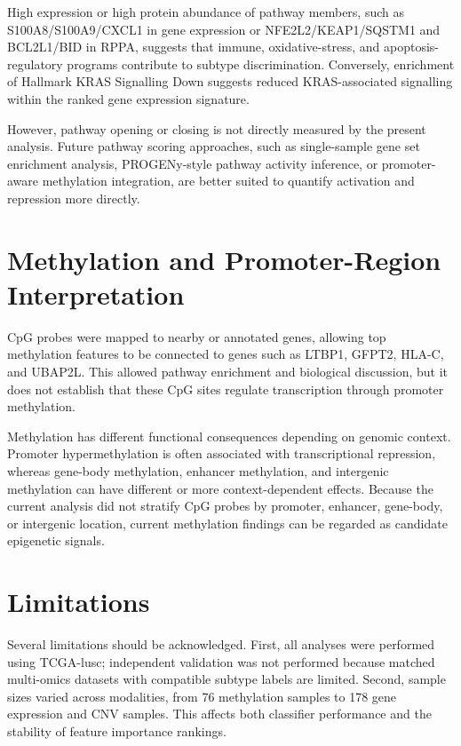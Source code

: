 High expression or high protein abundance of pathway members, such as S100A8/S100A9/CXCL1 in gene expression or NFE2L2/KEAP1/SQSTM1 and BCL2L1/BID in RPPA, suggests that immune, oxidative-stress, and apoptosis-regulatory programs contribute to subtype discrimination. Conversely, enrichment of Hallmark KRAS Signalling Down suggests reduced KRAS-associated signalling within the ranked gene expression signature.

However, pathway opening or closing is not directly measured by the present analysis. Future pathway scoring approaches, such as single-sample gene set enrichment analysis, PROGENy-style pathway activity inference, or promoter-aware methylation integration, are better suited to quantify activation and repression more directly.

\section{Methylation and Promoter-Region Interpretation}

CpG probes were mapped to nearby or annotated genes, allowing top methylation features to be connected to genes such as LTBP1, GFPT2, HLA-C, and UBAP2L. This allowed pathway enrichment and biological discussion, but it does not establish that these CpG sites regulate transcription through promoter methylation.

Methylation has different functional consequences depending on genomic context. Promoter hypermethylation is often associated with transcriptional repression, whereas gene-body methylation, enhancer methylation, and intergenic methylation can have different or more context-dependent effects. Because the current analysis did not stratify CpG probes by promoter, enhancer, gene-body, or intergenic location, current methylation findings can be regarded as candidate epigenetic signals.

\section{Limitations}

Several limitations should be acknowledged. First, all analyses were performed using TCGA-\gls{lusc}; independent validation was not performed because matched multi-omics datasets with compatible subtype labels are limited. Second, sample sizes varied across modalities, from 76 methylation samples to 178 gene expression and CNV samples. This affects both classifier performance and the stability of feature importance rankings.

